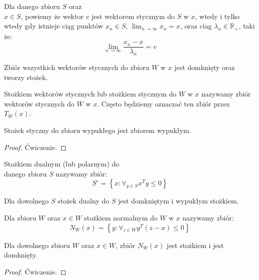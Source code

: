 \documentclass[10pt,a4paper,draft]{report}
\begin{document}
\begin{definition}
Dla danego zbioru $S$ oraz  \\ $x\in S$, powiemy że wektor $v$ jest wektorem stycznym do $S$ w $x$, wtedy i tylko wtedy gdy  istnieje ciąg punktów $x_n \in S$, $\lim_{n \rightarrow \infty} x_n = x$, oraz ciag $\lambda_n \in \mathbb{R}_+$, taki że:
\[
\lim_{n \rightarrow \infty} \frac{x_n  - x}{\lambda_n} = v 
\]
\end{definition}

\begin{theorem}
Zbiór wszystkich wektorów stycznych do zbioru $W$ w $x$ jest domknięty oraz tworzy stożek.
\end{theorem}


\begin{definition}
Stożkiem wektorów stycznych lub stożkiem stycznym do $W$ w $x$ nazywamy zbiór wektorów stycznych do $W$ w $x$. Często będziemy oznaczać ten zbiór przez $T_W(x)$.
\end{definition}

\begin{theorem}
Stożek styczny do zbioru wypukłego jest zbiorem wypukłym.
\end{theorem}
\begin{proof}
Ćwiczenie.
\end{proof}

\begin{definition} 
Stożkiem dualnym (lub polarnym) do \\ danego zbioru $S$ nazywamy zbiór:
\[
S^{\circ} = \left\{ x : \forall_{y \in S} x^T y \leq 0 \right\}
\]
\end{definition}
\begin{lemma}
Dla dowolnego $S$ stożek dualny do $S$ jest domkniętym i wypukłym stożkiem.
\end{lemma}

\begin{definition}
Dla zbioru $W$ oraz $x \in W$ stożkiem normalnym do $W$ w $x$ nazywamy zbiór:
\[
N_W(x) = \left\{ y : \forall_{z \in W} y^T (z-x) \leq 0 \right\}
\]
\end{definition}
\begin{lemma}
Dla dowolnego zbioru $W$ oraz $x \in W$, zbiór $N_W(x)$ jest stożkiem i jest domknięty.
\end{lemma}
\begin{proof}
Ćwiczenie.
\end{proof}
\end{document}
